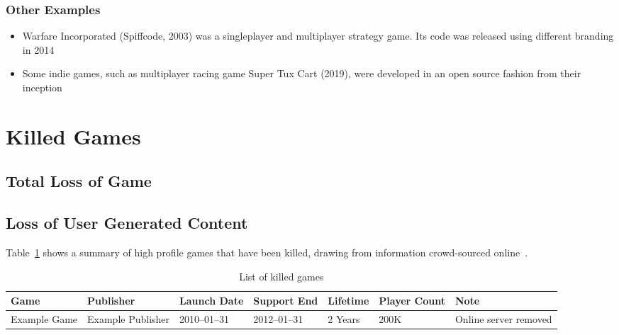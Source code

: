 \subsubsection*{Other Examples}
\begin{itemize}
    \item Warfare Incorporated (Spiffcode, 2003) was a singleplayer and multiplayer strategy game. Its code was released using different branding in 2014\cite{spiffcode-2014}
    \item Some indie games, such as multiplayer racing game Super Tux Cart (2019), were developed in an open source fashion from their inception\cite{supertux-2019}
\end{itemize}

\section{Killed Games}

\subsection{Total Loss of Game}

\subsection{Loss of User Generated Content}




Table~\ref{tab:killedgames} shows a summary of high profile games that have been killed, drawing from information crowd-sourced online~\cite{dead-games-list-2016}.

\begin{landscape}
\begin{table}[htbp]
    \centering
    \caption{List of killed games}%
    \label{tab:killedgames}
    \begin{tabular*}{1\textwidth}{lllllll}
        Game & Publisher & Launch Date & Support End & Lifetime & Player Count & Note \\ \toprule
        Example Game & Example Publisher & 2010--01--31 & 2012--01--31 & 2 Years & 200K & Online server removed \\
    \end{tabular*}
\end{table}
\end{landscape}

